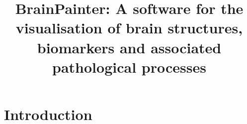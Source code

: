 \documentclass[10pt,xcolor=table,aspectratio=169]{beamer}
\title{BrainPainter: A software for the visualisation of brain structures, biomarkers and associated pathological processes}
\author[Raz]{\footnotesize{R\u{a}zvan V. Marinescu\inst{1,2} \and Arman Eshaghi\inst{2} \and Daniel C. Alexander\inst{2} \and Polina Golland\inst{1}}}
\institute{
1. Computer Science and Artificial Intelligence Laboratory, MIT, Cambridge, USA\\
2. Centre for Medical Image Computing, UCL, London, UK\\
3. Queen Square MS Centre, UCL Institute of Neurology, London, UK\\
}
\date{}
\begin{document}
 
\section{Introduction}

 \frame{\titlepage}
 

\newcommand{\upgradeReportLoc}{../../upgrade_report}
\newcommand{\epsrcPresLoc}{\upgradeReportLoc/epsrcPres}
\newcommand{\jointModellingDiseaseLoc}{../../jointModellingDisease}
\newcommand{\pcaLongPaperLoc}{../../PCA_long_paper}
\newcommand{\voxFld}{../../voxelwiseDPM}
\newcommand{\tadpoleFld}{/research/tadpole}
\newcommand{\diffEqModelFld}{../../diffEqModel}



\newcommand*{\pcaLongFigs}{\pcaLongPaperLoc/figures}






\newcommand{\ovHeight}{2cm}
\end{document}

